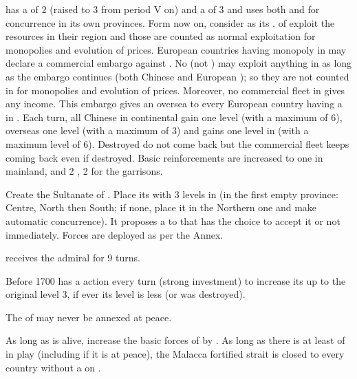 \effetlong
\aparag \paysChine has a \FTI of 2 (raised to 3 from period V on) and a \DTI
of 3 and uses both \FTI and \DTI for concurrence in its own provinces. Form
now on, consider  as its \CTZ.
\aparag \TP of \paysChine exploit the resources in their region and those are
counted as normal exploitation for monopolies and evolution of prices.
\aparag European countries having monopoly in  may declare a
commercial embargo against \paysChine.  No \TP (not \COL) may exploit anything
in \paysChine as long as the embargo continues (both Chinese and European
\TP); so they are not counted in for monopolies and evolution of
prices. Moreover, no commercial fleet in  gives any income. This
embargo gives an oversea \CB to every European country having a \TP in
\paysChine.
\aparag Each turn, all Chinese \TP in continental \paysChine gain one level
(with a maximum of 6), overseas \TP one level (with a maximum of 3) and
\paysChine gains one \TradeFLEET level in  (with a maximum level
of 6). Destroyed \TP do not come back but the commercial fleet keeps coming
back even if destroyed.
\aparag Basic reinforcements are increased to one \ARMY\faceplus in mainland,
and 2 \LD, 2 \ND for the garrisons.





\phevnt
\aparag Create the Sultanate of \paysaceh. Place its \TP\facemoins with 3
levels in
\granderegionSumatra (in the first empty province: Centre, North then South;
if none, place it in the Northern one and make automatic concurrence).
\bparag It proposes a \dipAT to \TUR that has the choice to accept it or not
immediately.
\bparag Forces are deployed as per the Annex.

\aparag[Malahayati] [BLP] \paysaceh receives the admiral
 for 9 turns.

\effetlong
\aparag Before 1700 \paysaceh has a \TP action every turn (strong investment)
to increase its \TP up to the original level 3, if ever its level is less (or
was destroyed).

\aparag The \TP of \paysaceh may never be annexed at peace.

\aparag[Malahayati] [BLP] As long as \leaderMalahayati is alive, increase the
basic forces of \paysaceh by \FLEET\faceplus.
\bparag As long as there is at least \FLEET\facemoins of \paysaceh in play
(including if it is at peace), the Malacca fortified strait is closed to every
country without a \dipAT on \paysaceh.

